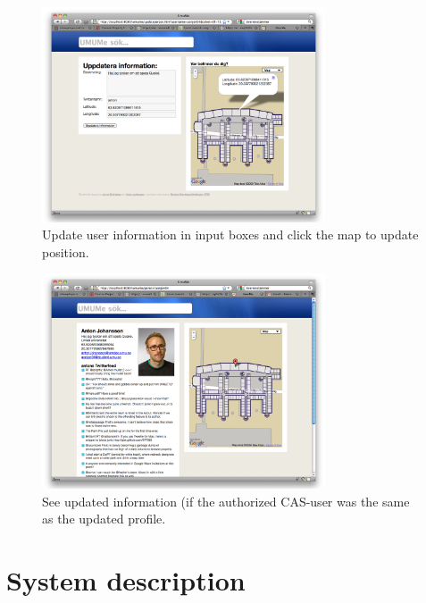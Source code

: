 \documentclass[titlepage, twocolumn, a4paper, 10pt]{article}
\begin{document}
\begin{figure}[H]
  \centering
  \includegraphics[width=3.3in]{images/pic5.png}
  \caption{Update user information in input boxes and click the map to
  update position.}
  \label{fig:images/edit}
\end{figure}

\begin{figure}[H]
  \centering
  \includegraphics[width=3.3in]{images/pic6.png}
  \caption{See updated information (if the authorized CAS-user was the same as the updated profile.}
  \label{fig:images/edited-user}
\end{figure}
\newpage
\section{System description}\label{sec:system}

\end{document}
